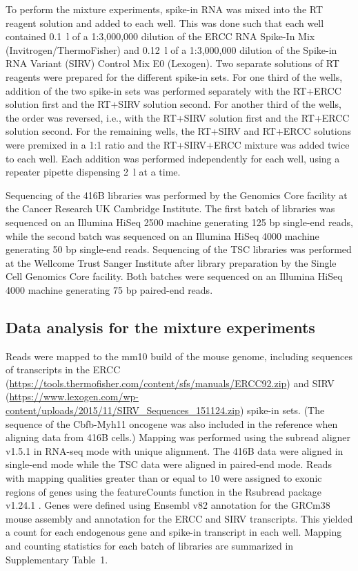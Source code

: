 \documentclass{article}
\newcommand{\supptabstats}{1}
\begin{document}
To perform the mixture experiments, spike-in RNA was mixed into the RT reagent solution and added to each well.
This was done such that each well contained 0.1~\textmu{}l of a 1:3,000,000 dilution of the ERCC RNA Spike-In Mix (Invitrogen/ThermoFisher) and 0.12~\textmu{}l of a 1:3,000,000 dilution of the Spike-in RNA Variant (SIRV) Control Mix E0 (Lexogen). 
Two separate solutions of RT reagents were prepared for the different spike-in sets.
For one third of the wells, addition of the two spike-in sets was performed separately with the RT+ERCC solution first and the RT+SIRV solution second.
For another third of the wells, the order was reversed, i.e., with the RT+SIRV solution first and the RT+ERCC solution second.
For the remaining wells, the RT+SIRV and RT+ERCC solutions were premixed in a 1:1 ratio and the RT+SIRV+ERCC mixture was added twice to each well.
Each addition was performed independently for each well, using a repeater pipette dispensing 2~\textmu{}l at a time.

Sequencing of the 416B libraries was performed by the Genomics Core facility at the Cancer Research UK Cambridge Institute.
The first batch of libraries was sequenced on an Illumina HiSeq 2500 machine generating 125 bp single-end reads, while the second batch was sequenced on an Illumina HiSeq 4000 machine generating 50 bp single-end reads.
Sequencing of the TSC libraries was performed at the Wellcome Trust Sanger Institute after library preparation by the Single Cell Genomics Core facility.
Both batches were sequenced on an Illumina HiSeq 4000 machine generating 75 bp paired-end reads.

\subsection{Data analysis for the mixture experiments}
Reads were mapped to the mm10 build of the mouse genome, including sequences of transcripts in the ERCC (\url{https://tools.thermofisher.com/content/sfs/manuals/ERCC92.zip}) and SIRV (\url{https://www.lexogen.com/wp-content/uploads/2015/11/SIRV_Sequences_151124.zip}) spike-in sets.
(The sequence of the Cbfb-Myh11 oncogene was also included in the reference when aligning data from 416B cells.)
Mapping was performed using the subread aligner v1.5.1 \cite{liao2013subread} in RNA-seq mode with unique alignment.
The 416B data were aligned in single-end mode while the TSC data were aligned in paired-end mode.
Reads with mapping qualities greater than or equal to 10 were assigned to exonic regions of genes using the featureCounts function in the Rsubread package v1.24.1 \cite{liao2014featurecounts}.
Genes were defined using Ensembl v82 annotation for the GRCm38 mouse assembly and annotation for the ERCC and SIRV transcripts.
This yielded a count for each endogenous gene and spike-in transcript in each well.
Mapping and counting statistics for each batch of libraries are summarized in Supplementary Table~\supptabstats{}.
\end{document}

